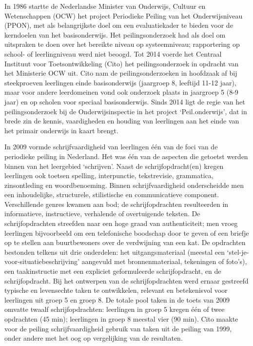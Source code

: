 \documentclass[
  letterpaper,
]{report}
\begin{document}
In 1986 startte de Nederlandse Minister van Onderwijs, Cultuur en
Wetenschappen (OCW) het project Periodieke Peiling van het
Onderwijsniveau (PPON), met als belangrijkste doel om een evaluatiekader
te bieden voor de kerndoelen van het basisonderwijs. Het
peilingsonderzoek had als doel om uitspraken te doen over het bereikte
niveau op systeemniveau; rapportering op school- of leerlingniveau werd
niet beoogd. Tot 2014 voerde het Centraal Instituut voor
Toetsontwikkeling (Cito) het peilingsonderzoek in opdracht van het
Ministerie OCW uit. Cito nam de peilingsonderzoeken in hoofdzaak af bij
steekproeven leerlingen einde basisonderwijs (jaargroep 8, leeftijd
11-12 jaar), maar voor andere leerdomeinen vond ook onderzoek plaats in
jaargroep 5 (8-9 jaar) en op scholen voor speciaal basisonderwijs. Sinds
2014 ligt de regie van het peilingsonderzoek bij de Onderwijsinspectie
in het project `Peil.onderwijs', dat in brede zin de kennis,
vaardigheden en houding van leerlingen aan het einde van het primair
onderwijs in kaart brengt.

In 2009 vormde schrijfvaardigheid van leerlingen één van de foci van de
periodieke peiling in Nederland. Het was één van de aspecten die
getoetst werden binnen van het leergebied `schrijven'. Naast de
schrijfopdracht(en) kregen leerlingen ook toetsen spelling,
interpunctie, tekstrevisie, grammatica, zinsontleding en woordbenoeming.
Binnen schrijfvaardigheid onderscheidde men een inhoudelijke,
structurele, stilistische en communicatieve component. Verschillende
genres kwamen aan bod; de schrijfopdrachten resulteerden in
informatieve, instructieve, verhalende of overtuigende teksten. De
schrijfopdrachten streefden naar een hoge graad van authenticiteit; men
vroeg leerlingen bijvoorbeeld om een telefonische boodschap door te
geven of een briefje op te stellen aan buurtbewoners over de verdwijning
van een kat. De opdrachten bestonden telkens uit drie onderdelen: het
uitgangsmateriaal (meestal een `stel-je-voor-situatiebeschrijving'
aangevuld met bronnenmateriaal, tekeningen of foto's), een
taakinstructie met een expliciet geformuleerde schrijfopdracht, en de
schrijfopdracht. Bij het ontwerpen van de schrijfopdrachten werd ernaar
gestreefd typische en levensechte taken te ontwikkelen, relevant en
betekenisvol voor leerlingen uit groep 5 en groep 8. De totale pool
taken in de toets van 2009 omvatte twaalf schrijfopdrachten: leerlingen
in groep 5 kregen één of twee opdrachten (45 min); leerlingen in groep 8
meestal vier (90 min). Cito maakte voor de peiling schrijfvaardigheid
gebruik van taken uit de peiling van 1999, onder andere met het oog op
vergelijking van de resultaten.
\end{document}
